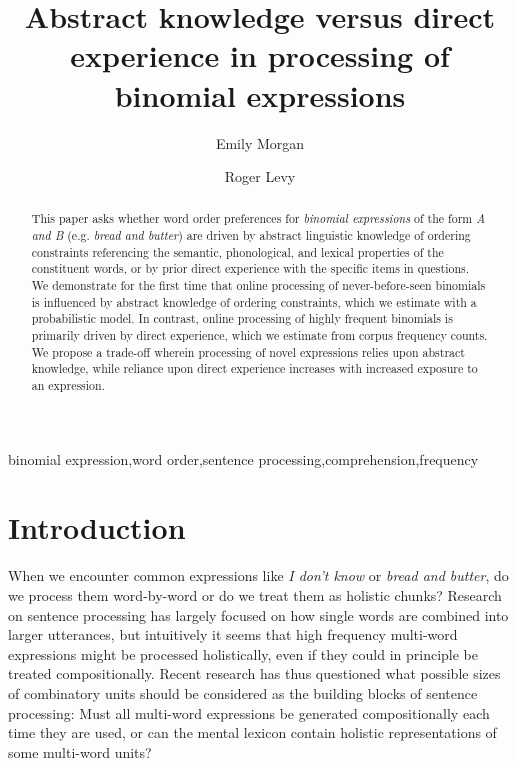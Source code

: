 \documentclass[authoryear]{elsarticle}
\begin{document}


\begin{frontmatter}
\title{Abstract knowledge versus direct experience in processing of binomial expressions}

\author[ucsd]{Emily Morgan}
\author[ucsd]{Roger Levy}

\address[ucsd]{Department of Linguistics, University of California at San Diego, 9500 Gilman Drive, La Jolla, CA 92093-0108, United States}




\begin{abstract}
This paper asks whether word order preferences for \emph{binomial expressions} of the form \emph{A and B} (e.g. \emph{bread and butter}) are driven by abstract linguistic knowledge of ordering constraints referencing the semantic, phonological, and lexical properties of the constituent words, or by prior direct experience with the specific items in questions. We demonstrate for the first time that online processing of never-before-seen binomials is influenced by abstract knowledge of ordering constraints, which we estimate with a probabilistic model. In contrast, online processing of highly frequent binomials is primarily driven by direct experience, which we estimate from corpus frequency counts. We propose a trade-off wherein processing of novel expressions relies upon abstract knowledge, while reliance upon direct experience increases with increased exposure to an expression.
\end{abstract}

\begin{keyword} binomial expression\sep word order\sep sentence processing\sep comprehension\sep frequency \end{keyword}


\end{frontmatter}

\section{Introduction}
When we encounter common expressions like \emph{I don't know} or \emph{bread and butter}, do we process them word-by-word or do we treat them as holistic chunks? Research on sentence processing has largely focused on how single words are combined into larger utterances, but intuitively it seems that high frequency multi-word expressions might be processed holistically, even if they could in principle be treated compositionally. Recent research has thus questioned what possible sizes of combinatory units should be considered as the building blocks of sentence processing: Must all multi-word expressions be generated compositionally each time they are used, or can the mental lexicon contain holistic representations of some multi-word units?
\end{document}
